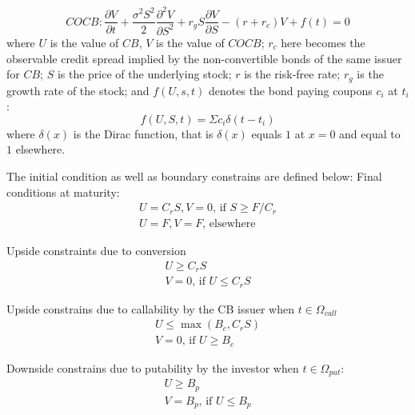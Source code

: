 \documentclass[12pt]{article}
\begin{document}
\begin{equation}
COCB: \frac{\partial{V}}{\partial{t}} + 
\frac{\sigma^2S^2}{2}\frac{\partial^2{V}}{\partial{S}^2} + r_gS\frac{\partial{V}}{\partial{S}} - (r+r_c)V + f(t) = 0 
\label{eq:COCB}
\end{equation}
where $U$ is the value of $CB$, $V$ is the value of $COCB$; $r_c$ here becomes the observable credit spread implied by the non-convertible bonds of the same issuer for $CB$; $S$ is the price of the underlying stock; $r$ is the risk-free rate; $r_g$ is the growth rate of the stock; and $f(U,s,t)$ denotes the bond paying coupons $c_i$ at $t_i$:
\begin{equation}
f(U,S,t) = \Sigma c_i\delta(t-t_i)
\label{eq:coupon}
\end{equation}
where $\delta(x)$ is the Dirac function, that is $\delta(x)$ equals $1$ at $x = 0$ and equal to $1$ elsewhere.

The initial condition as well as boundary constrains are defined below:
Final conditions at maturity:
\begin{eqnarray}
U = C_r S, V = 0\text{, if } S \ge F/C_r\\
U = F, V = F\text{, elsewhere }
\end{eqnarray}

Upside constraints due to conversion 
\begin{eqnarray}
U \ge C_r S\\
V = 0 \text{, if } U \le C_r S
\end{eqnarray}

Upside constrains due to callability by the CB issuer when $t\in \Omega_{call}$
\begin{eqnarray}
U \le \max(B_c, C_rS)\\
V = 0 \text{, if } U \ge B_c
\end{eqnarray}

Downside constrains due to putability by the investor when $t \in \Omega_{put}$:
\begin{eqnarray}
U \ge B_p \\
V = B_p \text{, if } U \le B_p
\end{eqnarray} 
\end{document}
